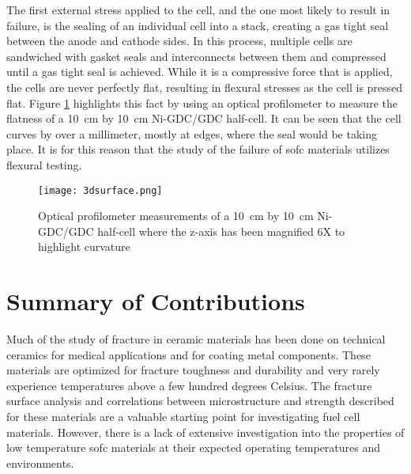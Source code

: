     The first external stress applied to the cell, and the one most likely to result in failure, is the  sealing of an individual cell into a stack, creating a gas tight seal between the anode and cathode sides.
    In this process, multiple cells are sandwiched with gasket seals and interconnects between them and compressed until a gas tight seal is achieved.
    While it is a compressive force that is applied, the cells are never perfectly flat, resulting in flexural stresses as the cell is pressed flat.
    Figure \ref{fig:flatness} highlights this fact by using an optical profilometer to measure the flatness of a \SI{10}{\centi\meter} by \SI{10}{\centi\meter} Ni-GDC/GDC half-cell.
    It can be seen that the cell curves by over a millimeter, mostly at edges, where the seal would be taking place.
    It is for this reason that the study of the failure of \gls{sofc} materials utilizes flexural testing.

    \begin{figure}[p]
      \centering
      \texttt{[image: 3dsurface.png]}
      \caption{Optical profilometer measurements of a \SI{10}{\centi\meter} by \SI{10}{\centi\meter} Ni-GDC/GDC half-cell where the z-axis has been magnified 6X to highlight curvature}\label{fig:flatness}
    \end{figure}

\section{Summary of Contributions}%
    Much of the study of fracture in ceramic materials has been done on technical ceramics for medical applications and for coating metal components.\cite{Deng2004,Ambrozic2007,Yonezu2014,Meille2012,Nie2010,Olagnon1999,Sorensen2001,Barinov1997}
    These materials are optimized for fracture toughness and durability and very rarely experience temperatures above a few hundred degrees Celsius.
    The fracture surface analysis and correlations between microstructure and strength described for these materials are a valuable starting point for investigating fuel cell materials.
    However, there is a lack of extensive investigation into the properties of low temperature \gls{sofc} materials at their expected operating temperatures and environments.

